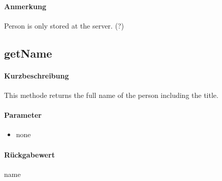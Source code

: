 \paragraph*{Anmerkung}
Person is only stored at the server. (?)

\subsection{getName}%
\paragraph*{Kurzbeschreibung}
This methode returns the full name of the person including the title.
\paragraph*{Parameter}
\begin{itemize}
    \item none
\end{itemize}
\paragraph*{Rückgabewert}
name